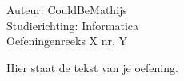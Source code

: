 \documentclass[a4paper]{article}
\begin{document}
  
\noindent \large Auteur: CouldBeMathijs \\
\noindent \large Studierichting: Informatica\\
\noindent \large Oefeningenreeks X nr. Y\\

\medskip

\normalsize

Hier staat de tekst van je oefening.

\begin{thebibliography}{999}
\end{thebibliography}
\end{document}
